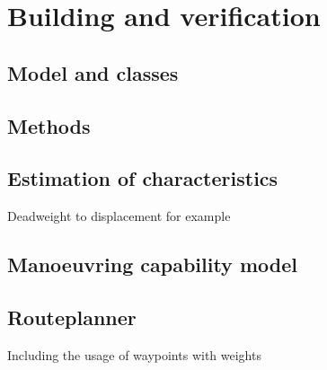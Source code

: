\chapter{Building and verification}

\section{Model and classes}

\section{Methods}

\section{Estimation of characteristics}
Deadweight to displacement for example

\section{Manoeuvring capability model}

\section{Routeplanner}
Including the usage of waypoints with weights